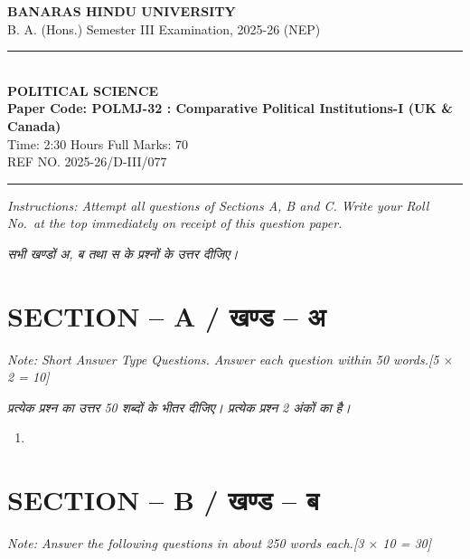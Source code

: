 \documentclass[11pt,a4paper]{article}
\newcommand{\pts}[1]{\hfill \textit{[#1]}}
\begin{document}
\begin{center}
  {\large\bfseries BANARAS HINDU UNIVERSITY}\\[2pt]
  {\normalsize B. A. (Hons.) Semester III Examination, 2025-26 (NEP)}\\[6pt]
  \rule{0.8\linewidth}{0.5pt}\\[6pt]
  {\large\bfseries POLITICAL SCIENCE}\\[4pt]
  {\large\bfseries Paper Code: POLMJ-32 : Comparative Political Institutions-I (UK \& Canada)}\\[4pt]
  {\normalsize Time: 2:30 Hours \hfill Full Marks: 70}\\[2pt]
  {\small REF NO. 2025-26/D-III/077}
\end{center}
\rule{\linewidth}{0.4pt}
\smallskip

\noindent \textit{Instructions: Attempt all questions of Sections A, B and C. Write your Roll No.\ at the top immediately on receipt of this question paper.}

\smallskip
\noindent \textit{सभी खण्डों अ, ब तथा स के प्रश्नों के उत्तर दीजिए।}

\bigskip

\section*{SECTION -- A / खण्ड -- अ}
\noindent \textit{Note: Short Answer Type Questions. Answer each question within 50 words.}\pts{5 $\times$ 2 = 10}

\noindent \textit{प्रत्येक प्रश्न का उत्तर 50 शब्दों के भीतर दीजिए। प्रत्येक प्रश्न 2 अंकों का है।}

\begin{enumerate}[label=\textbf{\arabic*.},leftmargin=*,itemsep=8pt]
  \item 
\end{enumerate}

\bigskip

\section*{SECTION -- B / खण्ड -- ब}
\noindent \textit{Note: Answer the following questions in about 250 words each.}\pts{3 $\times$ 10 = 30}
\end{document}
